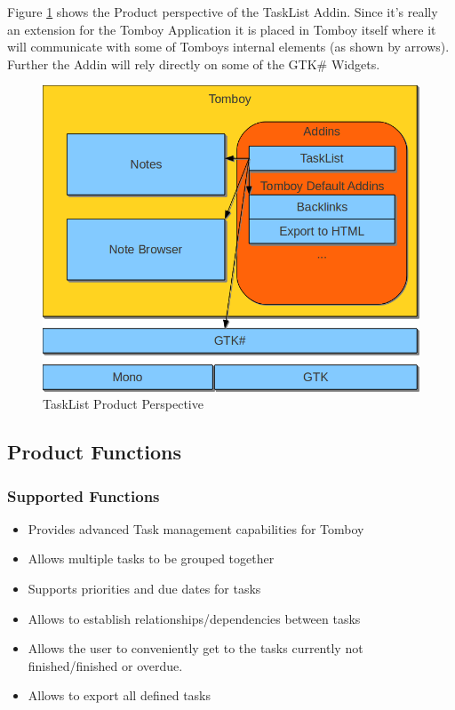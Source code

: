   Figure \ref{perspective} shows the Product perspective of the TaskList Addin. Since it's really an extension for the Tomboy Application it is placed in Tomboy itself where it will communicate with some of Tomboys internal elements (as shown by arrows). Further the Addin will rely directly on some of the GTK\# Widgets.
  \begin{figure}[h]
    \includegraphics[width=\textwidth]{graphics/product_perspective_diagram.png}
    \caption{TaskList Product Perspective}
    \label{perspective}
  \end{figure}


\subsection{Product Functions}
\label{description:functions}

  \subsubsection*{Supported Functions}
  \label{description:functions:supported}

    \begin{itemize}
      \item Provides advanced Task management capabilities for Tomboy
      \item Allows multiple tasks to be grouped together
      \item Supports priorities and due dates for tasks
      \item Allows to establish relationships/dependencies between tasks
      \item Allows the user to conveniently get to the tasks currently not finished/finished or overdue.
      \item Allows to export all defined tasks
    \end{itemize}


